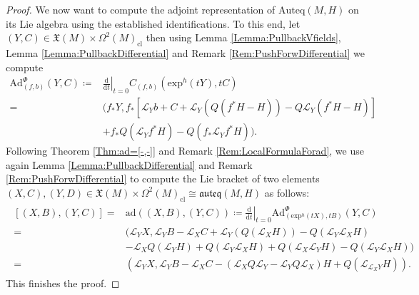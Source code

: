 \documentclass[12pt,a4paper]{article}
\theoremstyle{plain}
\theoremstyle{definition}
\newcommand{\VFs}{\mathfrak{X}(M)}
\newcommand{\Forms}[1]{\Omega^{#1}(M)}
\newcommand{\ClForms}[1]{\Forms{#1}_{\mathrm{cl}}}
\newcommand{\LieD}{\mathcal{L}}
\newcommand{\Auteq}{\mathrm{Auteq}(M,H)}
\newcommand{\auteq}{\mathfrak{auteq}(M,H)}
\newcommand{\eh}[1]{\mathrm{exp}^h(#1)}
\renewcommand{\d}{\mathrm{d}}
\begin{document}
\begin{proof}
We now want to compute the adjoint representation of $\Auteq$ on its Lie algebra using the established identifications. To this end, let $(Y,C)\in\VFs\times \ClForms{2}$ then using Lemma \ref{Lemma:PullbackVfields}, Lemma \ref{Lemma:PullbackDifferential} and Remark \ref{Rem:PushForwDifferential} we compute
\begin{align*}
    \mathrm{Ad}^\Phi_{(f,b)}(Y,C) \coloneqq& \left.\frac{\d}{\d t}\right|_{t=0}C_{(f,b)}(\eh{tY},tC)\\
    =&(f_*Y,f_*[\LieD_Yb+C+\LieD_Y(Q(f^*H-H))-Q\LieD_Y(f^*H-H)]\\
    &+f_*Q(\LieD_Yf^*H)-Q(f_*\LieD_Yf^*H)).
\end{align*}
Following Theorem \ref{Thm:ad=[-,-]} and Remark \ref{Rem:LocalFormulaForad}, we use again Lemma \ref{Lemma:PullbackDifferential} and Remark \ref{Rem:PushForwDifferential} to compute the Lie bracket of two elements
$(X,C),(Y,D)\in\VFs\times \ClForms{2}\cong \auteq$ as follows:
\begin{align}
\label{eq:LieBracketauteq}
\begin{split}
    [(X,B),(Y,C)]=&\mathrm{ad}((X,B),(Y,C))\coloneqq \left.\frac{\d}{\d t}\right|_{t=0}\mathrm{Ad}^\Phi_{(\eh{tX},tB)}(Y,C)\\
    =& (\LieD_YX,\LieD_YB-\LieD_XC+\LieD_Y(Q(\LieD_XH))-Q(\LieD_Y\LieD_XH)\\
    &-\LieD_XQ(\LieD_YH)+Q(\LieD_Y\LieD_XH)+Q(\LieD_X\LieD_YH)-Q(\LieD_Y\LieD_XH))\\
    =&(\LieD_YX,\LieD_YB-\LieD_XC-(\LieD_XQ\LieD_Y-\LieD_YQ\LieD_X)H+Q(\LieD_{\LieD_XY}H)).
\end{split}
\end{align}
This finishes the proof.
\end{proof}
\end{document}
